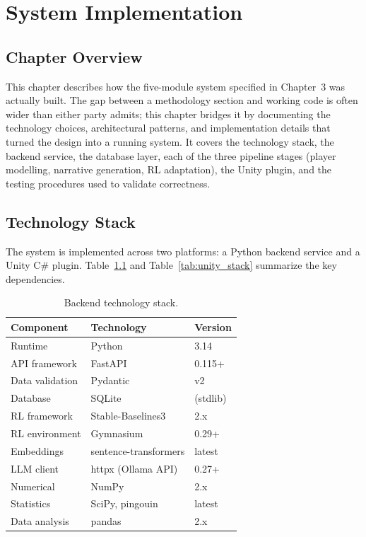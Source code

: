 \chapter{System Implementation}

\section{Chapter Overview}

This chapter describes how the five-module system specified in Chapter~3 was actually built. The gap between a methodology section and working code is often wider than either party admits; this chapter bridges it by documenting the technology choices, architectural patterns, and implementation details that turned the design into a running system. It covers the technology stack, the backend service, the database layer, each of the three pipeline stages (player modelling, narrative generation, RL adaptation), the Unity plugin, and the testing procedures used to validate correctness.

\section{Technology Stack}

The system is implemented across two platforms: a Python backend service and a Unity C\# plugin. Table~\ref{tab:backend_stack} and Table~\ref{tab:unity_stack} summarize the key dependencies.

\begin{table}[H]
\centering
\caption{Backend technology stack.}
\label{tab:backend_stack}
\small
\begin{tabular}{@{}lll@{}}
\toprule
\textbf{Component} & \textbf{Technology} & \textbf{Version} \\
\midrule
Runtime & Python & 3.14 \\
API framework & FastAPI & 0.115+ \\
Data validation & Pydantic & v2 \\
Database & SQLite & (stdlib) \\
RL framework & Stable-Baselines3 & 2.x \\
RL environment & Gymnasium & 0.29+ \\
Embeddings & sentence-transformers & latest \\
LLM client & httpx (Ollama API) & 0.27+ \\
Numerical & NumPy & 2.x \\
Statistics & SciPy, pingouin & latest \\
Data analysis & pandas & 2.x \\
\bottomrule
\end{tabular}
\end{table}

